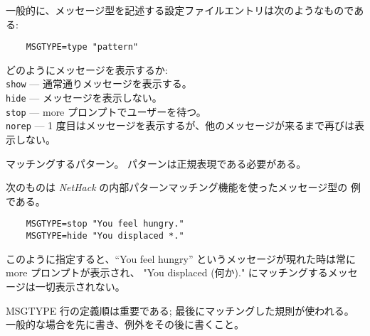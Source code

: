 一般的に、メッセージ型を記述する設定ファイルエントリは次のようなものである:
\begin{verbatim}
    MSGTYPE=type "pattern"
\end{verbatim}
\blist{}
\item[\ib{type}]
どのようにメッセージを表示するか:
\\
{\tt show}  --- 通常通りメッセージを表示する。\\
{\tt hide}  --- メッセージを表示しない。\\
{\tt stop}  --- more プロンプトでユーザーを待つ。\\
{\tt norep} --- 1 度目はメッセージを表示するが、他のメッセージが来るまで再びは表示しない。
\item[\ib{pattern}]
マッチングするパターン。
パターンは正規表現である必要がある。
\elist

次のものは {\it NetHack\/} の内部パターンマッチング機能を使ったメッセージ型の
例である。

\begin{verbatim}
    MSGTYPE=stop "You feel hungry."
    MSGTYPE=hide "You displaced *."
\end{verbatim}

このように指定すると、``You feel hungry'' というメッセージが現れた時は常に
more プロンプトが表示され、
"You displaced (何か)." にマッチングするメッセージは一切表示されない。

MSGTYPE 行の定義順は重要である; 最後にマッチングした規則が使われる。
一般的な場合を先に書き、例外をその後に書くこと。

